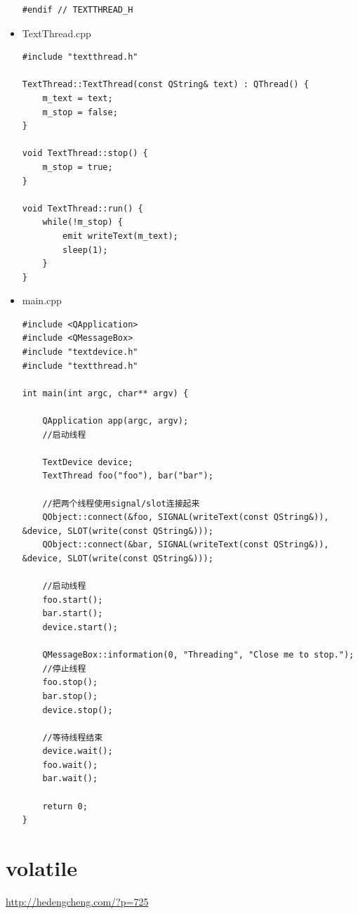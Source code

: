 \documentclass[9pt,b5paper]{article}
\begin{document}
\begin{itemize}
\begin{lstlisting}
#endif // TEXTTHREAD_H
\end{lstlisting}

\item TextThread.cpp    
\lstset{language=java,label= ,caption= ,numbers=none}
\begin{lstlisting}
#include "textthread.h"     

TextThread::TextThread(const QString& text) : QThread() {     
    m_text = text;     
    m_stop = false;     
}     

void TextThread::stop() {     
    m_stop = true;     
}     

void TextThread::run() {     
    while(!m_stop) {     
        emit writeText(m_text);     
        sleep(1);     
    }     
}
\end{lstlisting}

\item main.cpp    
\lstset{language=java,label= ,caption= ,numbers=none}
\begin{lstlisting}
#include <QApplication>    
#include <QMessageBox>    
#include "textdevice.h"    
#include "textthread.h"     
    
int main(int argc, char** argv) {     

    QApplication app(argc, argv);     
    //启动线程     

    TextDevice device;     
    TextThread foo("foo"), bar("bar");     

    //把两个线程使用signal/slot连接起来     
    QObject::connect(&foo, SIGNAL(writeText(const QString&)), &device, SLOT(write(const QString&)));     
    QObject::connect(&bar, SIGNAL(writeText(const QString&)), &device, SLOT(write(const QString&)));     

    //启动线程     
    foo.start();     
    bar.start();     
    device.start();     

    QMessageBox::information(0, "Threading", "Close me to stop.");     
    //停止线程     
    foo.stop();     
    bar.stop();     
    device.stop();     

    //等待线程结束     
    device.wait();     
    foo.wait();     
    bar.wait();     

    return 0;     
}
\end{lstlisting}
\end{itemize}

\section{volatile}
\label{sec-9}
\url{http://hedengcheng.com/?p=725}
\end{document}
